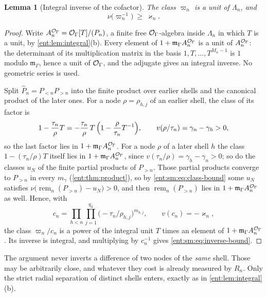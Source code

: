 \documentclass[11pt]{article}
\theoremstyle{plain}
\newtheorem{lemma}[lemma]{Lemma}
\theoremstyle{plain}
\theoremstyle{plain}
\theoremstyle{definition}
\theoremstyle{definition}
\theoremstyle{definition}
\theoremstyle{definition}
\theoremstyle{remark}
\newcommand{\mm}{\mathfrak m_\Gamma}
\DeclareMathOperator{\remp}{rem}\DeclareMathOperator{\Res}{Res}
\begin{document}
\begin{lemma}[Integral inverse of the cofactor]\label{ent:sm:lem:inverse-shell}
The class $\varpi_n$ is a unit of $\Lambda_n$, and
\begin{equation}\label{ent:sm:eq:inverse-bound}
 \nu\bigl(\varpi_n^{-1}\bigr)\ \ge\ \varkappa_n .
\end{equation}
\end{lemma}
\begin{proof}
Write $A_n^{\mathcal O_\Gamma}=\mathcal O_\Gamma[T]/(P_n)$, a finite free $\mathcal O_\Gamma$-algebra inside
$\Lambda_n$ in which $T$ is a unit, by \cref{ent:lem:integral}(b). Every
element of $1+\mm A_n^{\OO}$ is a unit of $A_n^{\mathcal O_\Gamma}$: the determinant of
its multiplication matrix in the basis $1,T,\ldots,T^{M_n-1}$ is $1$ modulo
$\mm$, hence a unit of $\mathcal O_\Gamma$, and the adjugate gives an integral inverse. No
geometric series is used.

Split $\widehat P_n=P_{<n}P_{>n}$ into the finite product over earlier shells
and the canonical product of the later ones. For a node $\rho=\rho_{h,j}$ of
an earlier shell, the class of its factor is
\[
 1-\frac{\tau_n}{\rho}T
 =-\frac{\tau_n}{\rho}\,T\,\Bigl(1-\frac{\rho}{\tau_n}T^{-1}\Bigr),
 \qquad v(\rho/\tau_n)=\gamma_n-\gamma_h>0,
\]
so the last factor lies in $1+\mm A_n^{\OO}$. For a node $\rho$ of a later
shell $h$ the class $1-(\tau_n/\rho)T$ itself lies in $1+\mm A_n^{\OO}$,
since $v(\tau_n/\rho)=\gamma_h-\gamma_n>0$; so do the classes $u_N$ of the
finite partial products of $P_{>n}$. Those partial products converge to
$P_{>n}$ in every $m_\gamma$ (\cref{ent:thm:product}), so by
\eqref{ent:sm:eq:class-bound} some $u_N$ satisfies
$\nu\bigl(\remp_n(P_{>n})-u_N\bigr)>0$, and then $\remp_n(P_{>n})$ lies in
$1+\mm A_n^{\OO}$ as well. Hence, with
\[
 c_n=\prod_{h<n}\prod_{j=1}^{q_h}\bigl(-\tau_n/\rho_{h,j}\bigr)^{m_{h,j}},
 \qquad v(c_n)=-\varkappa_n,
\]
the class $\varpi_n/c_n$ is a power of the integral unit $T$ times an element
of $1+\mm A_n^{\OO}$. Its inverse is integral, and multiplying by
$c_n^{-1}$ gives \eqref{ent:sm:eq:inverse-bound}.
\end{proof}

The argument never inverts a difference of two nodes of the \emph{same}
shell. Those may be arbitrarily close, and whatever they cost is already
measured by $R_n$. Only the strict radial separation of distinct shells
enters, exactly as in \cref{ent:lem:integral}(b).
\end{document}

